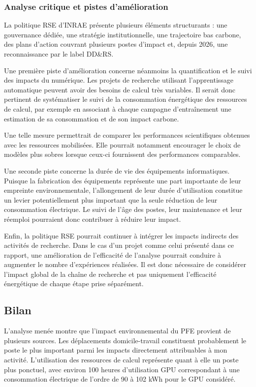 \documentclass[12pt,a4paper,twoside]{article}
\begin{document}
\subsubsection{Analyse critique et pistes d'amélioration}

La politique RSE d'INRAE présente plusieurs éléments structurants : une gouvernance dédiée, une stratégie institutionnelle, une trajectoire bas carbone, des plans d'action couvrant plusieurs postes d'impact et, depuis 2026, une reconnaissance par le label DD\&RS.

Une première piste d'amélioration concerne néanmoins la quantification et le suivi des impacts du numérique. Les projets de recherche utilisant l'apprentissage automatique peuvent avoir des besoins de calcul très variables. Il serait donc pertinent de systématiser le suivi de la consommation énergétique des ressources de calcul, par exemple en associant à chaque campagne d'entraînement une estimation de sa consommation et de son impact carbone.

Une telle mesure permettrait de comparer les performances scientifiques obtenues avec les ressources mobilisées. Elle pourrait notamment encourager le choix de modèles plus sobres lorsque ceux-ci fournissent des performances comparables.

Une seconde piste concerne la durée de vie des équipements informatiques. Puisque la fabrication des équipements représente une part importante de leur empreinte environnementale, l'allongement de leur durée d'utilisation constitue un levier potentiellement plus important que la seule réduction de leur consommation électrique. Le suivi de l'âge des postes, leur maintenance et leur réemploi pourraient donc contribuer à réduire leur impact.

Enfin, la politique RSE pourrait continuer à intégrer les impacts indirects des activités de recherche. Dans le cas d'un projet comme celui présenté dans ce rapport, une amélioration de l'efficacité de l'analyse pourrait conduire à augmenter le nombre d'expériences réalisées. Il est donc nécessaire de considérer l'impact global de la chaîne de recherche et pas uniquement l'efficacité énergétique de chaque étape prise séparément.

\subsection{Bilan}
\label{subsec:rse_bilan}

L'analyse menée montre que l'impact environnemental du PFE provient de plusieurs sources. Les déplacements domicile-travail constituent probablement le poste le plus important parmi les impacts directement attribuables à mon activité. L'utilisation des ressources de calcul représente quant à elle un poste plus ponctuel, avec environ 100 heures d'utilisation GPU correspondant à une consommation électrique de l'ordre de 90 à 102 kWh pour le GPU considéré.
\end{document}
